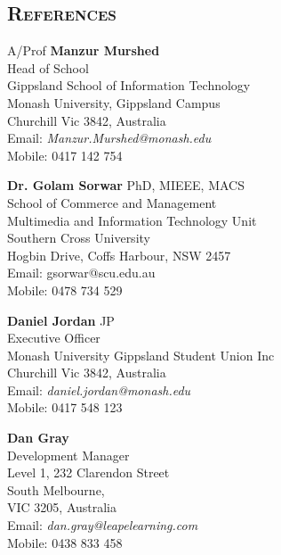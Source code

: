 \begin{resume}
\section{\textsc{References}}
\begin{minipage}[!t]{0.49\linewidth}
  A/Prof \textbf{Manzur Murshed}\\
  Head of School \\
  Gippsland School of Information Technology\\
  Monash University, Gippsland Campus\\
  Churchill Vic 3842, Australia\\
  Email: \textit{Manzur.Murshed@monash.edu}\\
  Mobile: 0417 142 754\\
\end{minipage}\hfill
\begin{minipage}[!t]{0.49\linewidth}
	\textbf{Dr. Golam Sorwar} PhD, MIEEE, MACS\\
	School of Commerce and Management\\
	Multimedia and Information Technology Unit\\
	Southern Cross University\\
	Hogbin Drive, Coffs Harbour, NSW 2457\\
	Email: gsorwar@scu.edu.au\\    
	Mobile: 0478 734 529\\   
\end{minipage}
\newline\newline
\begin{minipage}[!t]{0.49\linewidth}
  \textbf{Daniel Jordan} JP\\
  Executive Officer \\
  Monash University Gippsland Student Union Inc\\
  Churchill Vic 3842, Australia\\
  Email: \textit{daniel.jordan@monash.edu}\\
  Mobile: 0417 548 123\\
\end{minipage}\hfill
\begin{minipage}[!t]{0.49\linewidth}
  \textbf{Dan Gray}\\
  Development Manager\\
  Level 1, 232 Clarendon Street\\
  South Melbourne,\\
  VIC 3205, Australia\\
  Email: \textit{dan.gray@leapelearning.com}\\
  Mobile: 0438 833 458\\
\end{minipage}


\end{resume}

